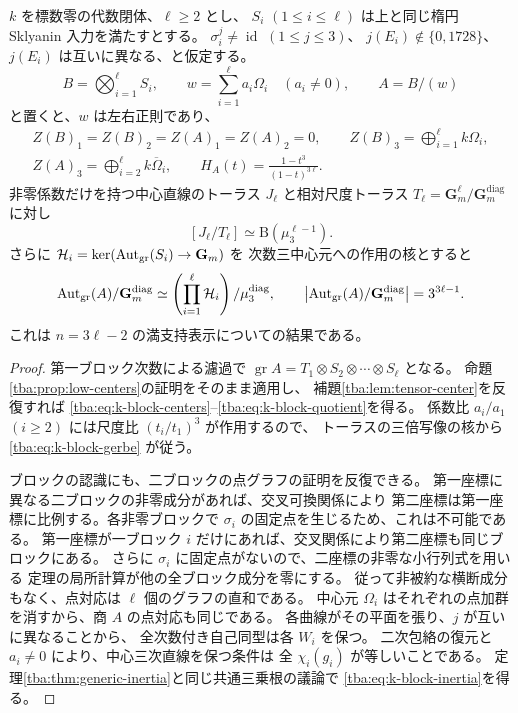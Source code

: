 \begin{corollary}
\label{tba:cor:k-block-center-inertia}
$k$ を標数零の代数閉体、$\ell\geq2$ とし、
$S_i$ $(1\leq i\leq\ell)$ は上と同じ楕円 Sklyanin 入力を満たすとする。
$\sigma_i^j\ne\operatorname{id}$ $(1\leq j\leq3)$、
$j(E_i)\notin\{0,1728\}$、$j(E_i)$ は互いに異なる、と仮定する。
\[
 B=\bigotimes_{i=1}^{\ell} S_i,\qquad
 w=\sum_{i=1}^{\ell} a_i\Omega_i\quad(a_i\ne0),\qquad A=B/(w)
\]
と置くと、$w$ は左右正則であり、
\begin{gather}
 Z(B)_1=Z(B)_2=Z(A)_1=Z(A)_2=0,\qquad
 Z(B)_3=\bigoplus_{i=1}^{\ell} k\Omega_i,
 \label{tba:eq:k-block-centers}\\
 Z(A)_3=\bigoplus_{i=2}^{\ell} k\overline\Omega_i,
 \qquad H_A(t)=\frac{1-t^3}{(1-t)^{3\ell}}.
 \label{tba:eq:k-block-quotient}
\end{gather}
非零係数だけを持つ中心直線のトーラス $J_\ell$ と相対尺度トーラス
$T_\ell=\mathbf G_m^\ell/\mathbf G_m^{\mathrm{diag}}$ に対し
\begin{equation}\label{tba:eq:k-block-gerbe}
 [J_\ell/T_\ell]\simeq\mathrm B(\mu_3^{\ell-1}).
\end{equation}
さらに $\mathcal H_i=\ker(\operatorname{Aut}_{\mathrm{gr}}(S_i)\to\mathbf G_m)$ を
次数三中心元への作用の核とすると
\begin{equation}\label{tba:eq:k-block-inertia}
 \operatorname{Aut}_{\mathrm{gr}}(A)/\mathbf G_m^{\mathrm{diag}}
 \simeq \left(\prod_{i=1}^{\ell}\mathcal H_i\right)/\mu_3^{\mathrm{diag}},
 \qquad
 \left|\operatorname{Aut}_{\mathrm{gr}}(A)/\mathbf G_m^{\mathrm{diag}}\right|
 =3^{3\ell-1}.
\end{equation}
これは $n=3\ell-2$ の満支持表示についての結果である。
\end{corollary}
\begin{proof}
第一ブロック次数による濾過で
$\operatorname{gr}A=T_1\otimes S_2\otimes\cdots\otimes S_\ell$ となる。
命題\ref{tba:prop:low-centers}の証明をそのまま適用し、
補題\ref{tba:lem:tensor-center}を反復すれば
\eqref{tba:eq:k-block-centers}--\eqref{tba:eq:k-block-quotient}を得る。
係数比 $a_i/a_1$ $(i\geq2)$ には尺度比 $(t_i/t_1)^3$ が作用するので、
トーラスの三倍写像の核から \eqref{tba:eq:k-block-gerbe} が従う。

ブロックの認識にも、二ブロックの点グラフの証明を反復できる。
第一座標に異なる二ブロックの非零成分があれば、交叉可換関係により
第二座標は第一座標に比例する。各非零ブロックで
$\sigma_i$ の固定点を生じるため、これは不可能である。
第一座標が一ブロック $i$ だけにあれば、交叉関係により第二座標も同じブロックにある。
さらに $\sigma_i$ に固定点がないので、二座標の非零な小行列式を用いる
定理の局所計算が他の全ブロック成分を零にする。
従って非被約な横断成分もなく、点対応は $\ell$ 個のグラフの直和である。
中心元 $\Omega_i$ はそれぞれの点加群を消すから、商 $A$ の点対応も同じである。
各曲線がその平面を張り、$j$ が互いに異なることから、
全次数付き自己同型は各 $W_i$ を保つ。
二次包絡の復元と $a_i\ne0$ により、中心三次直線を保つ条件は
全 $\chi_i(g_i)$ が等しいことである。
定理\ref{tba:thm:generic-inertia}と同じ共通三乗根の議論で
\eqref{tba:eq:k-block-inertia}を得る。
\end{proof}

